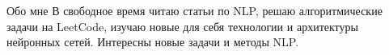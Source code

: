 \begin{rubric}{Обо мне}
\entry*[]{}В свободное время читаю статьи по NLP, решаю алгоритмические задачи на LeetCode,
изучаю новые для себя технологии и архитектуры нейронных сетей.
Интересны новые задачи и методы NLP.
\end{rubric}